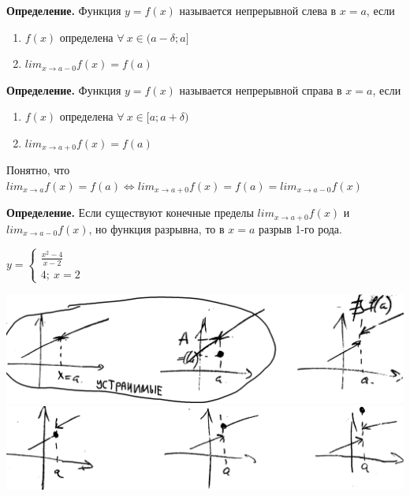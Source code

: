 \documentclass{article}
\begin{document}
    \textbf{Определение.} Функция \(y = f(x)\) называется непрерывной слева в \(x = a\), если

    \begin{enumerate}
        \item \(f(x)\) определена \( \forall\ x \in (a - \delta; a] \)
        \item \(lim_{x\rightarrow a-0} f(x)=f(a)\)
    \end{enumerate}

    \textbf{Определение.} Функция \(y = f(x)\) называется непрерывной справа в \(x = a\), если
    
    \begin{enumerate}
        \item \(f(x)\) определена \( \forall\ x \in [a; a + \delta) \)
        \item \(lim_{x\rightarrow a+0} f(x)=f(a)\)
    \end{enumerate}

    Понятно, что \( lim_{x \rightarrow a} f(x) = f(a) \Leftrightarrow lim_{x \rightarrow a + 0} f(x) = f(a) = lim_{x \rightarrow a - 0} f(x) \)

    \textbf{Определение.} Если существуют конечные пределы \(lim_{x \rightarrow a+0} f(x)\) и \(lim_{x \rightarrow a-0} f(x)\), но функция разрывна, то в \(x=a\) разрыв 1-го рода.

    \(y=\begin{cases}\frac{x^2-4}{x-2}\\ 4;\ x=2\end{cases}\)

    \begin{minipage}{0.49\linewidth}
        \includegraphics[width=\linewidth]{example_11_1_3_2.png}
        \includegraphics[width=\linewidth]{example_11_1_3_3.png}
    \end{minipage}
\end{document}
